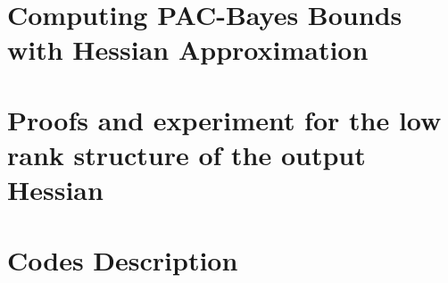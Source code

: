 \section{Computing PAC-Bayes Bounds with Hessian Approximation}


\newpage

\section{Proofs and experiment for the low rank structure of the output Hessian}
\label{sec:appendix_low_rank}

\section{Codes Description}

%
